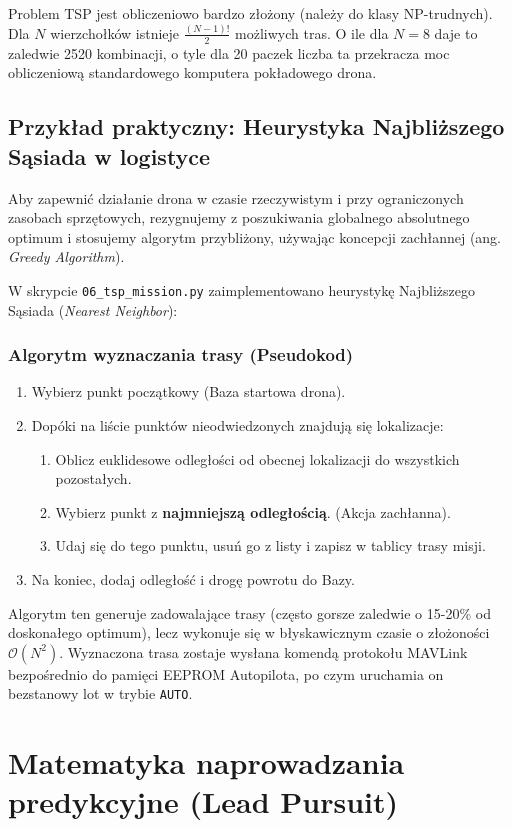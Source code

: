 Problem TSP jest obliczeniowo bardzo złożony (należy do klasy NP-trudnych). Dla $N$ wierzchołków istnieje $\frac{(N-1)!}{2}$ możliwych tras. O ile dla $N=8$ daje to zaledwie 2520 kombinacji, o tyle dla 20 paczek liczba ta przekracza moc obliczeniową standardowego komputera pokładowego drona.

\subsection{Przykład praktyczny: Heurystyka Najbliższego Sąsiada w logistyce}

Aby zapewnić działanie drona w czasie rzeczywistym i przy ograniczonych zasobach sprzętowych, rezygnujemy z poszukiwania globalnego absolutnego optimum i stosujemy algorytm przybliżony, używając koncepcji zachłannej (ang. \textit{Greedy Algorithm}).

W skrypcie \texttt{06\_tsp\_mission.py} zaimplementowano heurystykę Najbliższego Sąsiada (\textit{Nearest Neighbor}):
\subsubsection{Algorytm wyznaczania trasy (Pseudokod)}
\begin{enumerate}
    \item Wybierz punkt początkowy (Baza startowa drona).
    \item Dopóki na liście punktów nieodwiedzonych znajdują się lokalizacje:
    \begin{enumerate}
        \item Oblicz euklidesowe odległości od obecnej lokalizacji do wszystkich pozostałych.
        \item Wybierz punkt z \textbf{najmniejszą odległością}. (Akcja zachłanna).
        \item Udaj się do tego punktu, usuń go z listy i zapisz w tablicy trasy misji.
    \end{enumerate}
    \item Na koniec, dodaj odległość i drogę powrotu do Bazy.
\end{enumerate}
Algorytm ten generuje zadowalające trasy (często gorsze zaledwie o 15-20\% od doskonałego optimum), lecz wykonuje się w błyskawicznym czasie o złożoności $\mathcal{O}(N^2)$. Wyznaczona trasa zostaje wysłana komendą protokołu MAVLink bezpośrednio do pamięci EEPROM Autopilota, po czym uruchamia on bezstanowy lot w trybie \texttt{AUTO}.


\section{Matematyka naprowadzania predykcyjne (Lead Pursuit)}

